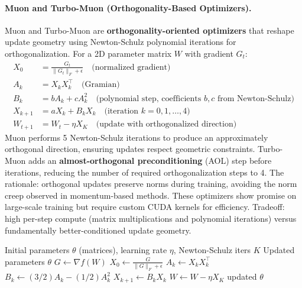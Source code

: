 \paragraph{Muon and Turbo-Muon (Orthogonality-Based Optimizers).}
Muon and Turbo-Muon are \textbf{orthogonality-oriented optimizers} that reshape update geometry using Newton-Schulz polynomial iterations for orthogonalization. For a 2D parameter matrix $W$ with gradient $G_t$:
\begin{align}
X_0 &= \frac{G_t}{\|G_t\|_F + \epsilon} \quad\text{(normalized gradient)} \\
A_k &= X_k X_k^\top \quad\text{(Gramian)} \\
B_k &= b A_k + c A_k^2 \quad\text{(polynomial step, coefficients $b, c$ from Newton-Schulz)} \\
X_{k+1} &= a X_k + B_k X_k \quad\text{(iteration $k=0,1,\ldots,4$)} \\
W_{t+1} &= W_t - \eta X_K \quad\text{(update with orthogonalized direction)}
\end{align}
Muon performs 5 Newton-Schulz iterations to produce an approximately orthogonal direction, ensuring updates respect geometric constraints. Turbo-Muon adds an \textbf{almost-orthogonal preconditioning} (AOL) step before iterations, reducing the number of required orthogonalization steps to 4. The rationale: orthogonal updates preserve norms during training, avoiding the norm creep observed in momentum-based methods. These optimizers show promise on large-scale training but require custom CUDA kernels for efficiency. Tradeoff: high per-step compute (matrix multiplications and polynomial iterations) versus fundamentally better-conditioned update geometry.

\begin{algorithm}[H]
\caption{Muon (Newton-Schulz Orthogonalization)}
\label{alg:muon}
\begin{algorithmic}[1]
\Require Initial parameters $\theta$ (matrices), learning rate $\eta$, Newton-Schulz iters $K$
\Ensure Updated parameters $\theta$
    \State $G \gets \nabla f(W)$ 
    \State $X_0 \gets \frac{G}{\|G\|_F + \epsilon}$ 
        \State $A_k \gets X_k X_k^\top$ 
        \State $B_k \gets (3/2) A_k - (1/2) A_k^2$ 
        \State $X_{k+1} \gets B_k X_k$ 
    \EndFor
    \State $W \gets W - \eta X_K$ 
\EndFor
\Return updated $\theta$
\end{algorithmic}
\end{algorithm}

